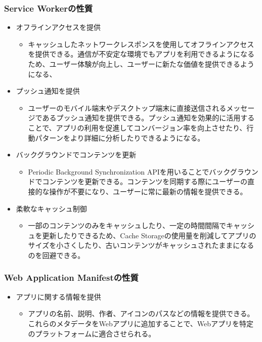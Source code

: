 \subsubsection{Service Workerの性質}
\label{subsubsection:Service Workerの性質}
\begin{itemize}
    \item オフラインアクセスを提供
    \begin{itemize}
        \item キャッシュしたネットワークレスポンスを使用してオフラインアクセスを提供できる。通信が不安定な環境でもアプリを利用できるようになるため、ユーザー体験が向上し、ユーザーに新たな価値を提供できるようになる、
    \end{itemize}
    \item プッシュ通知を提供
    \begin{itemize}
        \item ユーザーのモバイル端末やデスクトップ端末に直接送信されるメッセージであるプッシュ通知を提供できる。プッシュ通知を効果的に活用することで、アプリの利用を促進してコンバージョン率を向上させたり、行動パターンをより詳細に分析したりできるようになる。
    \end{itemize}
    \item バックグラウンドでコンテンツを更新
    \begin{itemize}
        \item Periodic Background Synchronization APIを用いることでバックグラウンドでコンテンツを更新できる。コンテンツを同期する際にユーザーの直接的な操作が不要になり、ユーザーに常に最新の情報を提供できる。
    \end{itemize}
    \item 柔軟なキャッシュ制御
    \begin{itemize}
        \item 一部のコンテンツのみをキャッシュしたり、一定の時間間隔でキャッシュを更新したりできるため、Cache Storageの使用量を削減してアプリのサイズを小さくしたり、古いコンテンツがキャッシュされたままになるのを回避できる。
    \end{itemize}
\end{itemize}
\subsubsection{Web Application Manifestの性質}\label{subsubsection:Web Application Manifestの性質}
\begin{itemize}
    \item アプリに関する情報を提供
    \begin{itemize}
        \item アプリの名前、説明、作者、アイコンのパスなどの情報を提供できる。これらのメタデータをWebアプリに追加することで、Webアプリを特定のプラットフォームに適合させられる。
    \end{itemize}
\end{itemize}
